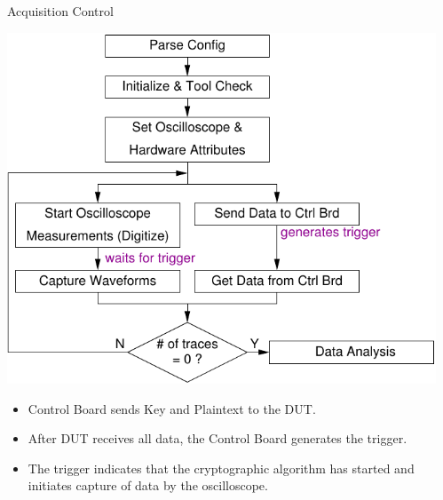 \documentclass[xcolor=pdftex,dvipsnames,table,final]{beamer}
\begin{document}
\begin{frame}[fragile]{}
\begin{columns}[t]
\begin{column}{.31\linewidth}
    \end{column}
    \begin{column}{.31\linewidth}
   
      


      \begin{block}{Acquisition Control}
        \begin{center}
          \includegraphics[scale=1.5]{../figures/data_acq}
        \end{center} 
        \begin{itemize}
          \item Control Board sends Key and Plaintext to the DUT.
          \item After DUT receives all data, the Control Board generates the trigger.
          \item The trigger indicates that the cryptographic algorithm has started
                and initiates capture of data by the oscilloscope.
        \end{itemize}
       \end{block}

\end{column}
\end{columns}
\end{frame}
\end{document}
